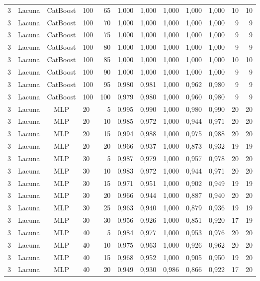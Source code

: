 \begin{longtable}{ccclrrrrrrrr}
3 & Lacuna & CatBoost & 100 & 65 & 1,000 & 1,000 & 1,000 & 1,000 & 1,000 & 10 & 10 \\
3 & Lacuna & CatBoost & 100 & 70 & 1,000 & 1,000 & 1,000 & 1,000 & 1,000 & 9 & 9 \\
3 & Lacuna & CatBoost & 100 & 75 & 1,000 & 1,000 & 1,000 & 1,000 & 1,000 & 9 & 9 \\
3 & Lacuna & CatBoost & 100 & 80 & 1,000 & 1,000 & 1,000 & 1,000 & 1,000 & 9 & 9 \\
3 & Lacuna & CatBoost & 100 & 85 & 1,000 & 1,000 & 1,000 & 1,000 & 1,000 & 10 & 10 \\
3 & Lacuna & CatBoost & 100 & 90 & 1,000 & 1,000 & 1,000 & 1,000 & 1,000 & 9 & 9 \\
3 & Lacuna & CatBoost & 100 & 95 & 0,980 & 0,981 & 1,000 & 0,962 & 0,980 & 9 & 9 \\
3 & Lacuna & CatBoost & 100 & 100 & 0,979 & 0,980 & 1,000 & 0,960 & 0,980 & 9 & 9 \\
3 & Lacuna & MLP & 20 & 5 & 0,995 & 0,990 & 1,000 & 0,980 & 0,990 & 20 & 20 \\
3 & Lacuna & MLP & 20 & 10 & 0,985 & 0,972 & 1,000 & 0,944 & 0,971 & 20 & 20 \\
3 & Lacuna & MLP & 20 & 15 & 0,994 & 0,988 & 1,000 & 0,975 & 0,988 & 20 & 20 \\
3 & Lacuna & MLP & 20 & 20 & 0,966 & 0,937 & 1,000 & 0,873 & 0,932 & 19 & 19 \\
3 & Lacuna & MLP & 30 & 5 & 0,987 & 0,979 & 1,000 & 0,957 & 0,978 & 20 & 20 \\
3 & Lacuna & MLP & 30 & 10 & 0,983 & 0,972 & 1,000 & 0,944 & 0,971 & 20 & 20 \\
3 & Lacuna & MLP & 30 & 15 & 0,971 & 0,951 & 1,000 & 0,902 & 0,949 & 19 & 19 \\
3 & Lacuna & MLP & 30 & 20 & 0,966 & 0,944 & 1,000 & 0,887 & 0,940 & 20 & 20 \\
3 & Lacuna & MLP & 30 & 25 & 0,963 & 0,940 & 1,000 & 0,879 & 0,936 & 19 & 19 \\
3 & Lacuna & MLP & 30 & 30 & 0,956 & 0,926 & 1,000 & 0,851 & 0,920 & 17 & 19 \\
3 & Lacuna & MLP & 40 & 5 & 0,984 & 0,977 & 1,000 & 0,953 & 0,976 & 20 & 20 \\
3 & Lacuna & MLP & 40 & 10 & 0,975 & 0,963 & 1,000 & 0,926 & 0,962 & 20 & 20 \\
3 & Lacuna & MLP & 40 & 15 & 0,968 & 0,952 & 1,000 & 0,905 & 0,950 & 19 & 20 \\
3 & Lacuna & MLP & 40 & 20 & 0,949 & 0,930 & 0,986 & 0,866 & 0,922 & 17 & 20 \\

\end{longtable}
